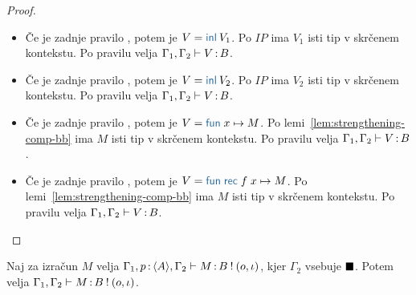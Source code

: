 \begin{proof}
\begin{itemize}
		\item Če je zadnje pravilo , potem je $V = \tminl{V_1}$.
		Po $IP$ ima $V_1$ isti tip v skrčenem kontekstu.
		Po pravilu  velja $\Gamma_1, \Gamma_2 \vdash V \mathinner{:} B$.
		
		\item Če je zadnje pravilo , potem je $V = \tminl{V_2}$.
		Po $IP$ ima $V_2$ isti tip v skrčenem kontekstu.
		Po pravilu  velja $\Gamma_1, \Gamma_2 \vdash V \mathinner{:} B$.
		
		\item Če je zadnje pravilo , potem je $V = \tmfunano{x}{M}$.
		Po lemi~\ref{lem:strengthening-comp-bb} ima $M$ isti tip v skrčenem kontekstu.
		Po pravilu  velja $\Gamma_1, \Gamma_2 \vdash V \mathinner{:} B$.
		
		\item Če je zadnje pravilo , potem je $V = \tmfunrecano{f}{x}{M}$.
		Po lemi~\ref{lem:strengthening-comp-bb} ima $M$ isti tip v skrčenem kontekstu.
		Po pravilu  velja $\Gamma_1, \Gamma_2 \vdash V \mathinner{:} B$.
		
	\end{itemize}
\end{proof}

\begin{lema}\label{lem:strengthening-comp-bb}
	Naj za izračun $M$ velja $\Gamma_1, p \mathinner{:} \langle A \rangle, \Gamma_2 \vdash M \mathinner{:} B \mathbin{!} (o, \iota)$, kjer $\Gamma_2$ vsebuje $\blacksquare$. Potem velja $\Gamma_1, \Gamma_2 \vdash M \mathinner{:} B \mathbin{!} (o, \iota)$.
\end{lema}

